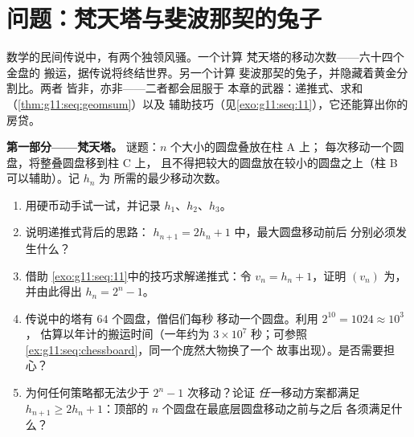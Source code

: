\section{问题：梵天塔与斐波那契的兔子}

\begin{problem}
\label{pb:g11:seq:1}
数学的民间传说中，有两个独领风骚。一个计算
梵天塔的移动次数——六十四个金盘的
搬运，据传说将终结世界。另一个计算
斐波那契的兔子，并隐藏着黄金分割比。两者
皆非，亦非——二者都会屈服于
本章的武器：递推式、求和
（\cref{thm:g11:seq:geomsum}）以及
辅助技巧（见\cref{exo:g11:seq:11}），它还能算出你的房贷。

\medskip
\noindent\textbf{第一部分——梵天塔。}
谜题：$n$ 个大小的圆盘叠放在柱 A 上；
每次移动一个圆盘，将整叠圆盘移到柱 C 上，
且不得把较大的圆盘放在较小的圆盘之上（柱 B 可以辅助）。记 $h_n$ 为
所需的最少移动次数。
\begin{enumerate}
  \item 用硬币动手试一试，并记录 $h_1$、$h_2$、$h_3$。
  \item 说明递推式背后的思路：
        $h_{n+1} = 2h_n + 1$ 中，最大圆盘移动前后
        分别必须发生什么？
  \item 借助
        \cref{exo:g11:seq:11}中的技巧求解递推式：令 $v_n = h_n + 1$，证明
        $(v_n)$ 为，并由此得出 $h_n = 2^n - 1$。
  \item 传说中的塔有 $64$ 个圆盘，僧侣们每秒
        移动一个圆盘。利用 $2^{10} = 1024 \approx 10^3$，
        估算以年计的搬运时间（一年约为
        $3 \times 10^7$ 秒；可参照
        \cref{ex:g11:seq:chessboard}，同一个庞然大物换了一个
        故事出现）。是否需要担心？
  \item 为何任何策略都无法少于 $2^n - 1$ 次移动？论证
        \emph{任一}移动方案都满足
        $h_{n+1} \geq 2 h_n + 1$：顶部的
        $n$ 个圆盘在最底层圆盘移动之前与之后
        各须满足什么？
\end{enumerate}


\end{problem}
